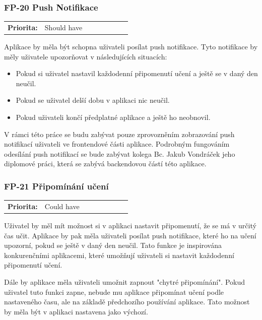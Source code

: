 \subsubsection{FP-20 Push Notifikace}

\begin{tabular}{lp{0.7\linewidth}}
    \textbf{Priorita:} & Should have \\
\end{tabular}

Aplikace by měla být schopna uživateli posílat push notifikace. %
Tyto notifikace by měly uživatele upozorňovat v následujících situacích:

\begin{itemize}
    \item Pokud si uživatel nastavil každodenní připomenutí učení a ještě se v daný den neučil.
    \item Pokud se uživatel delší dobu v aplikaci nic neučil.
    \item Pokud uživateli končí předplatné aplikace a ještě ho neobnovil.
\end{itemize}

V rámci této práce se budu zabývat pouze zprovozněním zobrazování push notifikací uživateli ve frontendové části aplikace. Podrobným fungováním odesílání push notifikací se bude zabývat kolega Bc. Jakub Vondráček jeho diplomové práci, která se zabývá backendovou částí této aplikace. %

\subsubsection{FP-21 Připomínání učení}

\begin{tabular}{lp{0.7\linewidth}}
    \textbf{Priorita:} & Could have \\
\end{tabular}

Uživatel by měl mít možnost si v aplikaci nastavit připomenutí, že se má v určitý čas učit. Aplikace by pak měla uživateli posílat push notifikace, které ho na učení upozorní, pokud se ještě v daný den neučil. Tato funkce je inspirována konkurenčními aplikacemi, které umožňují uživateli si nastavit každodenní připomenutí učení.

Dále by aplikace měla uživateli umožnit zapnout "chytré připomínání". Pokud uživatel tuto funkci zapne, nebude mu aplikace připomínat učení podle nastaveného času, ale na základě předchozího používání aplikace. Tato možnost by měla být v aplikaci nastavena jako výchozí.

